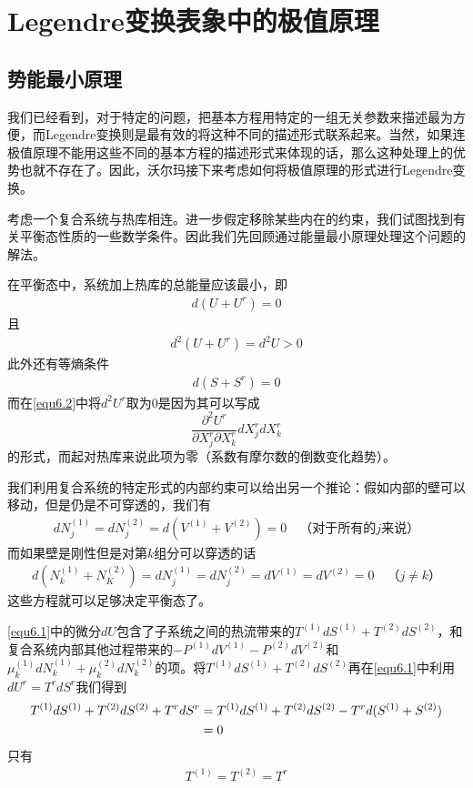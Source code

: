 \chapter{Legendre变换表象中的极值原理}
\label{chap6}

\section{势能最小原理}\label{sec6.1}

我们已经看到，对于特定的问题，把基本方程用特定的一组无关参数来描述最为方便，而Legendre变换则是最有效的将这种不同的描述形式联系起来。当然，如果连极值原理不能用这些不同的基本方程的描述形式来体现的话，那么这种处理上的优势也就不存在了。因此，沃尔玛接下来考虑如何将极值原理的形式进行Legendre变换。

考虑一个复合系统与热库相连。进一步假定移除某些内在的约束，我们试图找到有关平衡态性质的一些数学条件。因此我们先回顾通过能量最小原理处理这个问题的解法。

在平衡态中，系统加上热库的总能量应该最小，即
\begin{align}\label{equ6.1}
d(U+U^r)=0
\end{align}
且
\begin{align}\label{equ6.2}
d^2(U+U^r)=d^2U>0
\end{align}
此外还有等熵条件
\begin{align}\label{equ6.3}
d(S+S^r)=0
\end{align}
而在\eqref{equ6.2}中将$d^2U^r$取为0是因为其可以写成
\[\frac{\partial^2 U^r}{\partial X_j^r\partial X_k^r}dX_j^rdX_k^r \]
的形式，而起对热库来说此项为零（系数有摩尔数的倒数变化趋势）。

我们利用复合系统的特定形式的内部约束可以给出另一个推论：假如内部的壁可以移动，但是仍是不可穿透的，我们有
\begin{align}\label{equ6.4}
dN_j^{(1)}=dN_j^{(2)}=d(V^{(1)}+V^{(2)})=0 \quad\text{（对于所有的$j$来说）}
\end{align}
而如果壁是刚性但是对第$k$组分可以穿透的话
\begin{align}\label{equ6.5}
d(N_k^{(1)}+N_K^{(2)})=dN_j^{(1)}=dN_j^{(2)}=dV^{(1)}=dV^{(2)}=0 \quad\text{（$j\neq k$）}
\end{align}
这些方程就可以足够决定平衡态了。

\eqref{equ6.1}中的微分$dU$包含了子系统之间的热流带来的$T^{(1)}dS^{(1)}+T^{(2)}dS^{(2)}$，和复合系统内部其他过程带来的$-P^{(1)}dV^{(1)}-P^{(2)}dV^{(2)}$和$\mu_k^{(1)}dN_k^{(1)}+\mu_k^{(2)}dN_k^{(2)}$的项。将$T^{(1)}dS^{(1)}+T^{(2)}dS^{(2)}$再在\eqref{equ6.1}中利用$dU^r=T^rdS^r$我们得到
\begin{align}\notag{}
T^{(1)}dS^{(1)}+T^{(2)}dS^{(2)}+T^rdS^r&=T^{(1)}dS^{(1)}+T^{(2)}dS^{(2)}-T^rd(S^{(1)}+S^{(2)})\\
&=0\label{equ6.6}
\end{align}
只有
\begin{align}\label{equ6.7}
T^{(1)}=T^{(2)}=T^r
\end{align}


